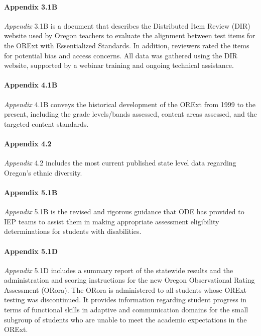 \documentclass[]{article}
\let\oldparagraph\paragraph
\renewcommand{\paragraph}[1]{\oldparagraph{#1}\mbox{}}
\begin{document}
\paragraph{Appendix 3.1B}\label{appendix-3.1b}

\emph{Appendix} 3.1B is a document that describes the Distributed Item
Review (DIR) website used by Oregon teachers to evaluate the alignment
between test items for the ORExt with Essentialized Standards. In
addition, reviewers rated the items for potential bias and access
concerns. All data was gathered using the DIR website, supported by a
webinar training and ongoing technical assistance.

\paragraph{Appendix 4.1B}\label{appendix-4.1b}

\emph{Appendix} 4.1B conveys the historical development of the ORExt
from 1999 to the present, including the grade levels/bands assessed,
content areas assessed, and the targeted content standards.

\paragraph{Appendix 4.2}\label{appendix-4.2}

\emph{Appendix} 4.2 includes the most current published state level data
regarding Oregon's ethnic diversity.

\paragraph{Appendix 5.1B}\label{appendix-5.1b}

\emph{Appendix} 5.1B is the revised and rigorous guidance that ODE has
provided to IEP teams to assist them in making appropriate assessment
eligibility determinations for students with disabilities.

\paragraph{Appendix 5.1D}\label{appendix-5.1d}

\emph{Appendix} 5.1D includes a summary report of the statewide results
and the administration and scoring instructions for the new Oregon
Observational Rating Assessment (ORora). The ORora is administered to
all students whose ORExt testing was discontinued. It provides
information regarding student progress in terms of functional skills in
adaptive and communication domains for the small subgroup of students
who are unable to meet the academic expectations in the ORExt.
\end{document}
